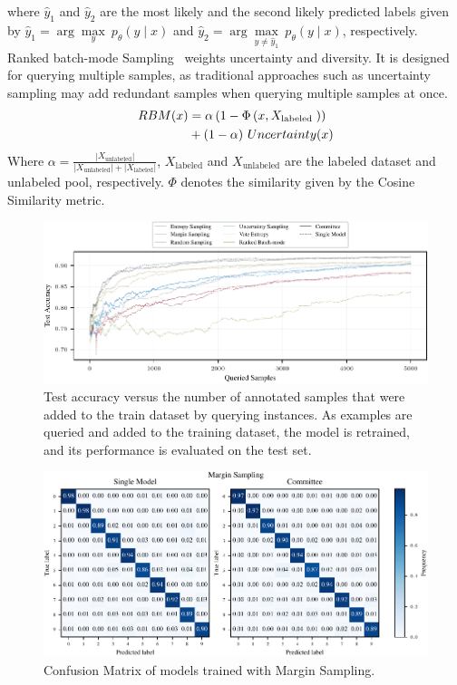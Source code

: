 \documentclass{article}
\theoremstyle{plain}
\theoremstyle{definition}
\theoremstyle{remark}
\begin{document}
where $\hat{y}_1$ and $\hat{y}_2$ are the most likely and the second likely predicted labels given by $\hat{y}_1=\operatorname{arg}\underset{y}{\operatorname{max}} \  p_\theta(y \mid x)$ and $\hat{y}_2=\operatorname{arg}\underset{y \neq \hat{y}_1}{\operatorname{max}} \  p_\theta(y \mid x)$, respectively. \\
Ranked batch-mode Sampling~\cite{ranked_batch_mode_query_strategy} weights uncertainty and diversity. It is designed for querying multiple samples, as traditional approaches such as uncertainty sampling may add redundant samples when querying multiple samples at once. \\
\begin{align}
	RBM(x)&=\alpha \left(1-\Phi\left(x, X_{\text {labeled }}\right)\right) \notag \\ &+(1-\alpha) \ Uncertainty(x)
\end{align}
Where $\alpha=\frac{\left|X_{\text {unlabeled}}\right|}{\left|X_{\text {unlabeled}}\right|+\left|X_{\text {labeled}}\right|}$, $X_{\text {labeled}}$ and $X_{\text {unlabeled}}$ are the labeled dataset and unlabeled pool, respectively. $\Phi$ denotes the similarity given by the Cosine Similarity metric.
\begin{figure}[!h]
	\begin{center}
		\includegraphics[width=0.95\linewidth]{fig/test_accuracy.pdf}
	\end{center}
	\caption{Test accuracy versus the number of annotated samples that were added to the train dataset by querying instances. As examples are queried and added to the training dataset, the model is retrained, and its performance is evaluated on the test set.}
	\label{accuracy_plot}
\end{figure}
\begin{figure}[!h]
	\begin{center}
		\includegraphics[width=0.95\linewidth]{fig/conf_mat_margin_sampling.pdf}
	\end{center}
	\caption{Confusion Matrix of models trained with Margin Sampling.}
	\label{conf_mat_margin_sampling}
\end{figure}
\end{document}
